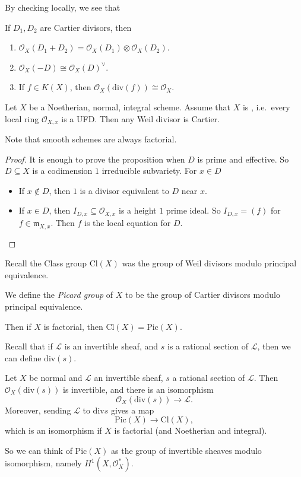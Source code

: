 \documentclass[a4paper]{article}
\renewcommand\div{\mathrm{div}}
\newcommand\Cl{\mathrm{Cl}}
\newcommand\Pic{\mathrm{Pic}}
\begin{document}
By checking locally, we see that
\begin{prop}
  If $D_1, D_2$ are Cartier divisors, then
  \begin{enumerate}
    \item $\mathcal{O}_X(D_1 + D_2) = \mathcal{O}_X(D_1) \otimes \mathcal{O}_X(D_2)$.
    \item $\mathcal{O}_X(-D) \cong \mathcal{O}_X(D)^{\vee}$.
    \item If $f \in K(X)$, then $\mathcal{O}_X(\div(f)) \cong \mathcal{O}_X$.\fakeqed
  \end{enumerate}
\end{prop}

\begin{prop}
  Let $X$ be a Noetherian, normal, integral scheme. Assume that $X$ is , i.e.\ every local ring $\mathcal{O}_{X, x}$ is a UFD. Then any Weil divisor is Cartier.
\end{prop}
Note that smooth schemes are always factorial.

\begin{proof}
  It is enough to prove the proposition when $D$ is prime and effective. So $D \subseteq X$ is a codimension $1$ irreducible subvariety. For $x \in D$
  \begin{itemize}
    \item If $x \not \in D$, then $1$ is a divisor equivalent to $D$ near $x$.
    \item If $x \in D$, then $I_{D, x} \subseteq \mathcal{O}_{X, x}$ is a height $1$ prime ideal. So $I_{D, x} = (f)$ for $f \in \mathfrak{m}_{X, x}$. Then $f$ is the local equation for $D$.\qedhere
  \end{itemize}
\end{proof}

Recall the Class group $\Cl(X)$ was the group of Weil divisors modulo principal equivalence.
\begin{defi}
  We define the \emph{Picard group} of $X$ to be the group of Cartier divisors modulo principal equivalence.
\end{defi}
Then if $X$ is factorial, then $\Cl(X) = \Pic(X)$.

Recall that if $\mathcal{L}$ is an invertible sheaf, and $s$ is a rational section of $\mathcal{L}$, then we can define $\div(s)$.

\begin{thm}
  Let $X$ be normal and $\mathcal{L}$ an invertible sheaf, $s$ a rational section of $\mathcal{L}$. Then $\mathcal{O}_X(\div(s))$ is invertible, and there is an isomorphism
  \[
    \mathcal{O}_X(\div(s)) \to \mathcal{L}.
  \]
  Moreover, sending $\mathcal{L}$ to $\div s$ gives a map
  \[
    \Pic(X) \to \Cl(X),
  \]
  which is an isomorphism if $X$ is factorial (and Noetherian and integral).
\end{thm}
So we can think of $\Pic(X)$ as the group of invertible sheaves modulo isomorphism, namely $H^1(X, \mathcal{O}_X^*)$.
\end{document}
